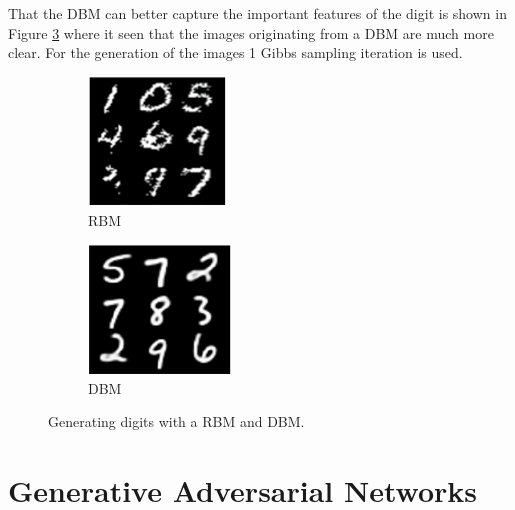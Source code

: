 \documentclass[a4paper,10pt]{article}
\begin{document}
That the DBM can better capture the important features of the digit is shown in Figure \ref{fig:compareDBM2} where it seen that the images originating from a DBM are much more clear. For the generation of the images 1 Gibbs sampling iteration is used. 

\begin{figure}[h]
	\begin{subfigure}{0.49\textwidth}
		\centering
		\includegraphics[width=0.4\linewidth]{DBM_RBM_gen.png}
		\caption{RBM}
		\label{fig:RBM_gen}
	\end{subfigure}	 	
	\begin{subfigure}{0.49\textwidth}
		\centering
		\includegraphics[width=0.4\linewidth]{DBM_gen.png}
		\caption{DBM}
		\label{fig:DBM_gen}
	\end{subfigure}	
	\caption{Generating digits with a RBM and DBM.}
	\label{fig:compareDBM2}
\end{figure}


\section{Generative Adversarial Networks}
\end{document}
